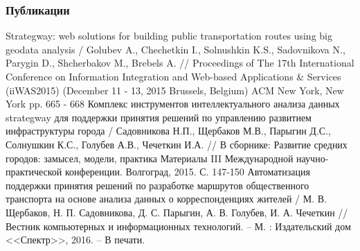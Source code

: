 \begin{frame}
    \frametitle{Публикации}
    \scriptsize
    \begin{thebibliography}{10}
         Strategway: web solutions for building public transportation routes using big geodata 
            analysis / Golubev A., Chechetkin I., Solnushkin K.S., Sadovnikova N., Parygin D., Shcherbakov M., 
            Brebels A. // Proceedings of The 17th International Conference on Information Integration and 
            Web-based Applications \& Services (iiWAS2015) (December 11 - 13, 2015 Brussels, Belgium) 
            ACM New York, New York pp. 665 - 668
         Комплекс инструментов интеллектуального анализа данных strategway для поддержки 
            принятия решений по управлению развитием инфраструктуры города / Садовникова Н.П., Щербаков М.В., 
            Парыгин Д.С., Солнушкин К.С., Голубев А.В., Чечеткин И.А. // В сборнике: Развитие средних 
            городов: замысел, модели, практика Материалы III Международной научно-практической конференции. 
            Волгоград, 2015. С. 147-150
         Автоматизация поддержки принятия решений по разработке маршрутов общественного 
            транспорта на основе анализа данных о корреспонденциях жителей / М. В. Щербаков, 
            Н. П. Садовникова, Д. С. Парыгин, А. В. Голубев, И. А. Чечеткин // Вестник компьютерных и 
            информационных технологий. -- М. : Издательский дом <<Спектр>>, 2016. -- В печати.
    \end{thebibliography}
\end{frame}

